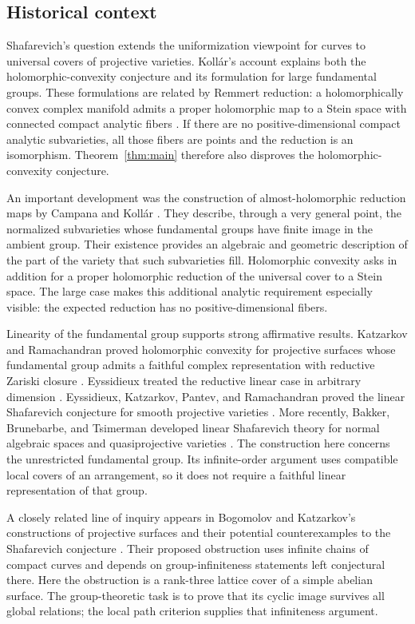 \subsection{Historical context}
Shafarevich's question extends the uniformization viewpoint for curves
to universal covers of projective varieties.  Koll\'ar's account
\cite[Introduction, Section~0.3]{Kollar1995} explains both the
holomorphic-convexity conjecture and its formulation for large
fundamental groups.  These formulations are related by Remmert
reduction: a holomorphically convex complex manifold admits a proper
holomorphic map to a Stein space with connected compact analytic
fibers \cite[Introduction, p.~1546]{EKPR2012}.  If there are no positive-dimensional
compact analytic subvarieties, all those fibers are points and the
reduction is an isomorphism.  Theorem~\ref{thm:main} therefore also
disproves the holomorphic-convexity conjecture.

An important development was the construction of almost-holomorphic reduction maps by
Campana and Koll\'ar \cite{Campana1994,Kollar1993,Kollar1995}.
They describe, through a very general point, the normalized subvarieties
whose fundamental groups have finite image in the ambient group.
Their existence provides an algebraic
and geometric description of the part of the variety that such
subvarieties fill.  Holomorphic convexity asks in addition for a
proper holomorphic reduction of the universal cover to a Stein space.
The large case makes this additional analytic requirement especially
visible: the expected reduction has no positive-dimensional fibers.

Linearity of the fundamental group supports strong affirmative
results.  Katzarkov and Ramachandran proved holomorphic convexity for
projective surfaces whose fundamental group admits a faithful complex
representation with reductive Zariski closure
\cite{KatzarkovRamachandran1998}.  Eyssidieux treated the reductive
linear case in arbitrary dimension \cite{Eyssidieux2004}.
Eyssidieux, Katzarkov, Pantev, and
Ramachandran proved the linear Shafarevich conjecture for smooth
projective varieties \cite{EKPR2012}.  More recently, Bakker,
Brunebarbe, and Tsimerman developed linear Shafarevich theory for
normal algebraic spaces and quasiprojective varieties
\cite{BBT2024}.  The construction here concerns the unrestricted
fundamental group.  Its infinite-order argument uses compatible
local covers of an arrangement, so it does not require a faithful
linear representation of that group.

A closely related line of inquiry appears in Bogomolov and Katzarkov's
constructions of projective surfaces and their potential counterexamples
to the Shafarevich conjecture
\cite[Section~4]{BogomolovKatzarkov1998}.  Their proposed obstruction
uses infinite chains of compact curves and depends on group-infiniteness
statements left conjectural there.
Here the obstruction is a rank-three lattice cover of a simple abelian
surface.  The group-theoretic task is to prove that its cyclic image
survives all global relations; the local path criterion supplies that
infiniteness argument.

